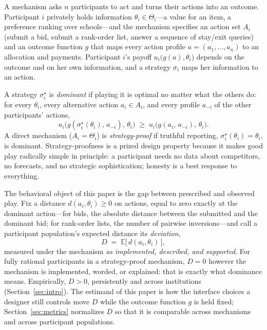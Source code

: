 A mechanism asks $n$ participants to act and turns their actions into an outcome. Participant $i$ privately holds information $\theta_i \in \Theta_i$---a value for an item, a preference ranking over schools---and the mechanism specifies an action set $A_i$ (submit a bid, submit a rank-order list, answer a sequence of stay/exit queries) and an outcome function $g$ that maps every action profile $a = (a_1, \dots, a_n)$ to an allocation and payments. Participant $i$'s payoff $u_i\big(g(a), \theta_i\big)$ depends on the outcome and on her own information, and a strategy $\sigma_i$ maps her information to an action.

A strategy $\sigma^{\star}_i$ is \emph{dominant} if playing it is optimal no matter what the others do: for every $\theta_i$, every alternative action $a_i \in A_i$, and every profile $a_{-i}$ of the other participants' actions,
\[
u_i\big(g(\sigma^{\star}_i(\theta_i),\, a_{-i}),\, \theta_i\big) \;\ge\; u_i\big(g(a_i,\, a_{-i}),\, \theta_i\big).
\]
A direct mechanism ($A_i = \Theta_i$) is \emph{strategy-proof} if truthful reporting, $\sigma^{\star}_i(\theta_i) = \theta_i$, is dominant. Strategy-proofness is a prized design property because it makes good play radically simple in principle: a participant needs no data about competitors, no forecasts, and no strategic sophistication; honesty is a best response to everything.

The behavioral object of this paper is the gap between prescribed and observed play. Fix a distance $d(a_i, \theta_i) \ge 0$ on actions, equal to zero exactly at the dominant action---for bids, the absolute distance between the submitted and the dominant bid; for rank-order lists, the number of pairwise inversions---and call a participant population's expected distance its \emph{deviation},
\[
D \;=\; \mathbb{E}\big[\, d(a_i, \theta_i) \,\big],
\]
measured under the mechanism \emph{as implemented, described, and supported}. For fully rational participants in a strategy-proof mechanism, $D = 0$ however the mechanism is implemented, worded, or explained: that is exactly what dominance means. Empirically, $D > 0$, persistently and across institutions (Section~\ref{sec:intro}). The estimand of this paper is how the interface choices a designer still controls move $D$ while the outcome function $g$ is held fixed; Section~\ref{sec:metrics} normalizes $D$ so that it is comparable across mechanisms and across participant populations.

